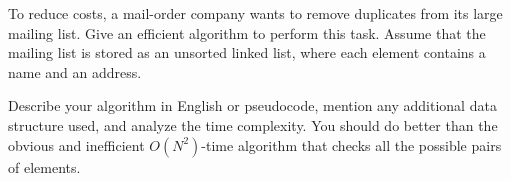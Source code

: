 To reduce costs, a mail-order company wants to remove duplicates from
its large mailing list.  Give an efficient
algorithm to perform this task.  Assume that the mailing list is stored
as an unsorted linked list, where each element contains a name and
an address.

Describe your algorithm in English or pseudocode, mention any
additional data structure used, and analyze the time complexity.  You
should do better than the obvious and inefficient $O(N^2)$-time
algorithm that checks all the possible pairs of elements.
